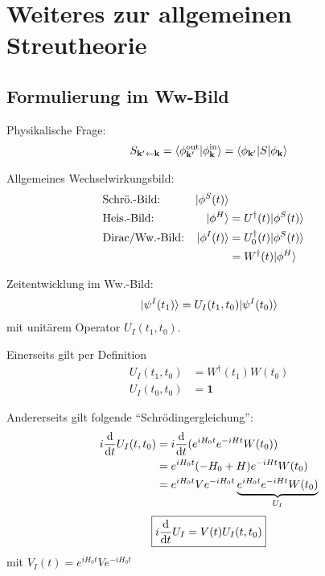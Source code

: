 \documentclass[11pt,a4paper]{report}
\begin{document}
\section{Weiteres zur allgemeinen Streutheorie}

\subsection{Formulierung im Ww-Bild}

Physikalische Frage: 
\begin{align*}
    S_{\mathbf{k}' \leftarrow \mathbf{k}} = \langle \phi_{\mathbf{k}'}^{\text{out}}|\phi_{\mathbf{k}}^{\text{in}}\rangle = \langle \phi_{\mathbf{k}'} | S|\phi_{\mathbf{k}}\rangle 
\end{align*}

Allgemeines Wechselwirkungsbild:
\begin{align*}
    &\text{Schrö.-Bild:} & |\phi^S(t)\rangle \\
    &\text{Heis.-Bild:} & |\phi^H\rangle &= U^\dagger(t) |\phi^S(t)\rangle \\
    &\text{Dirac/Ww.-Bild:} & |\phi^I(t)\rangle &= U_0^\dagger(t) |\phi^S(t)\rangle \\
    &&&=W^\dagger(t) |\phi^H\rangle
\end{align*}

Zeitentwicklung im Ww.-Bild:
\begin{align*}
    |\psi^I (t_1)\rangle = U_I(t_1 ,t_0) |\psi^I(t_0)\rangle
\end{align*}
mit unitärem Operator $U_I (t_1, t_0)$.

Einerseits gilt per Definition
\begin{align*}
    U_I(t_1, t_0) &= W^\dagger (t_1) W(t_0) \\
    U_I(t_0, t_0) &= \mathbf{1}
\end{align*}

Andererseits gilt folgende ``Schrödingergleichung'':
\begin{align*}
    i \frac{\mathrm{d}}{\mathrm{d} t} U_I(t, t_0) &= i \frac{\mathrm{d}}{\mathrm{d} t} (e^{i H_0 t} e^{-i H t} W(t_0)) \\
    &= e^{i H_0 t} (-H_0+ H) e^{-i H t} W(t_0) \\
    &= e^{i H_0 t} V e^{-i H_0 t} \underbrace{e^{i H_0 t} e^{-i H t} W(t_0)}_{U_I}
\end{align*}
\begin{align*}
    \boxed{i \frac{\mathrm{d}}{\mathrm{d} t} U_I = V(t) U_I(t, t_0)}
\end{align*}
mit $V_I(t) = e^{i H_0 t} V e^{-i H_0 t}$
\end{document}
